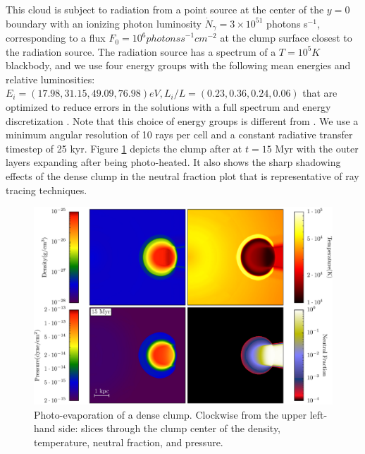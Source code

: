 This cloud is subject to radiation from a point source at the center
of the $y=0$ boundary with an ionizing photon luminosity
$\dot{N}_\gamma = 3 \times 10^{51}$ photons s$^{-1}$, corresponding to
a flux $F_0 = 10^6 \unit{photons s}^{-1} \unit{cm}^{-2}$ at the clump
surface closest to the radiation source.  The radiation source has a
spectrum of a $T = 10^5 \unit{K}$ blackbody, and we use four energy
groups with the following mean energies and relative luminosities:
$E_i = (17.98, 31.15, 49.09, 76.98) \unit{eV}, L_i/L = (0.23, 0.36,
0.24, 0.06)$ that are optimized to reduce errors in the solutions with
a full spectrum and energy discretization \citep{Mirocha12}.  Note
that this choice of energy groups is different from
\citet{Wise11_Moray}.  We use a minimum angular resolution of 10 rays
per cell and a constant radiative transfer timestep of 25 kyr.  Figure
\ref{fig:shadowing} depicts the clump after at $t = 15$ Myr with the
outer layers expanding after being photo-heated.  It also shows the
sharp shadowing effects of the dense clump in the neutral fraction
plot that is representative of ray tracing techniques.

\begin{figure}
  \centering
  \includegraphics[width=1.0\textwidth]{figures/code-test-shadowing.eps}
  \caption{Photo-evaporation of a dense clump.  Clockwise from the
    upper left-hand side: slices through the clump center of the
    density, temperature, neutral fraction, and pressure.}
  \label{fig:shadowing}
\end{figure}





